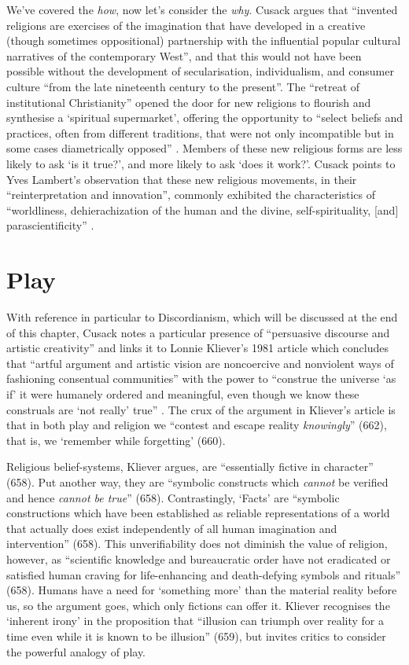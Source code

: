 \documentclass[Draft.tex]{subfiles}
\begin{document}
We've covered the \textit{how}, now let's consider the \textit{why}.
Cusack \parencite*[7]{Cusack10} argues that ``invented religions are
exercises of the imagination that have developed in a creative
(though sometimes oppositional) partnership with the influential
popular cultural narratives of the contemporary West'',
and that this would not have been possible without
the development of secularisation, individualism, and consumer culture
``from the late nineteenth century to the present''.
The ``retreat of institutional Christianity'' opened the door
for new religions to flourish and synthesise a `spiritual supermarket',
offering the opportunity to ``select beliefs and practices,
often from different traditions, that were not only incompatible
but in some cases diametrically opposed'' \parencite[25, 17]{Cusack10}.
Members of these new religious forms are less likely to ask
`is it true?', and more likely to ask `does it work?'.
Cusack \parencite[9]{Cusack10} points to Yves Lambert's observation that
these new religious movements, in their ``reinterpretation and innovation'',
commonly exhibited the characteristics of
``worldliness, dehierachization of the human and the divine,
self-spirituality, [and] parascientificity'' \parencite[303]{Lambert99}.


\section*{Play}
With reference in particular to Discordianism,
which will be discussed at the end of this chapter,
Cusack \parencite*[23]{Cusack10} notes a particular presence of
``persuasive discourse and artistic creativity'' and links it to
Lonnie Kliever's 1981 article which concludes that
``artful argument and artistic vision are noncoercive and nonviolent ways
of fashioning consentual communities'' with the power to
``construe the universe `as if' it were humanely ordered and meaningful,
even though we know these construals are
`not really' true'' \parencite[665]{Kliever81}.
The crux of the argument in Kliever's article is that
in both play and religion we
``contest and escape reality \textit{knowingly}'' (662),
that is, we `remember while forgetting' (660).

Religious belief-systems, Kliever argues,
are ``essentially fictive in character'' (658).
Put another way, they are
``symbolic constructs which \textit{cannot} be verified
and hence \textit{cannot be true}'' (658).
Contrastingly, `Facts' are
``symbolic constructions which have been established as
reliable representations of a world that actually does exist
independently of all human imagination and intervention'' (658).
This unverifiability does not diminish the value of religion,
however, as ``scientific knowledge and bureaucratic order
have not eradicated or satisfied human craving
for life-enhancing and death-defying symbols and rituals'' (658).
Humans have a need for `something more' than
the material reality before us, so the argument goes,
which only fictions can offer it.
Kliever recognises the `inherent irony' in the proposition that
``illusion can triumph over reality for a time
even while it is known to be illusion'' (659),
but invites critics to consider the powerful analogy of play.
\end{document}
